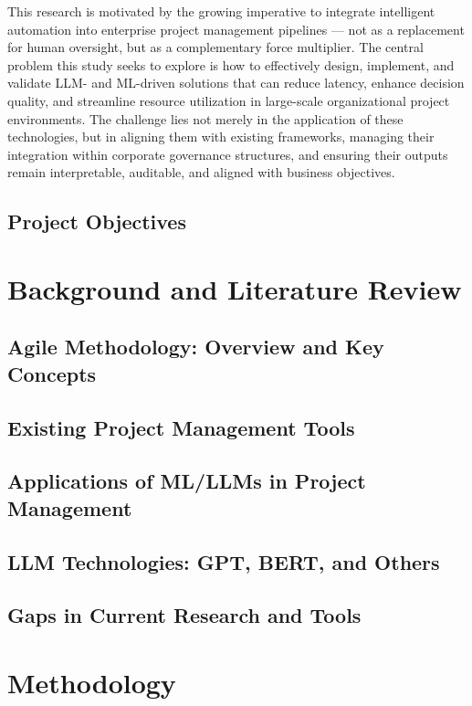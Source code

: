 \documentclass[12pt,a4paper]{report}
\begin{document}
This research is motivated by the growing imperative to integrate intelligent automation into enterprise project management pipelines — not as a replacement for human oversight, but as a complementary force multiplier. The central problem this study seeks to explore is how to effectively design, implement, and validate LLM- and ML-driven solutions that can reduce latency, enhance decision quality, and streamline resource utilization in large-scale organizational project environments. The challenge lies not merely in the application of these technologies, but in aligning them with existing frameworks, managing their integration within corporate governance structures, and ensuring their outputs remain interpretable, auditable, and aligned with business objectives.

\section{Project Objectives}


\chapter{Background and Literature Review}  %
\section{Agile Methodology: Overview and Key Concepts}
\section{Existing Project Management Tools}
\section{Applications of ML/LLMs in Project Management}
\section{LLM Technologies: GPT, BERT, and Others}
\section{Gaps in Current Research and Tools}

\chapter{Methodology}  %
\end{document}
